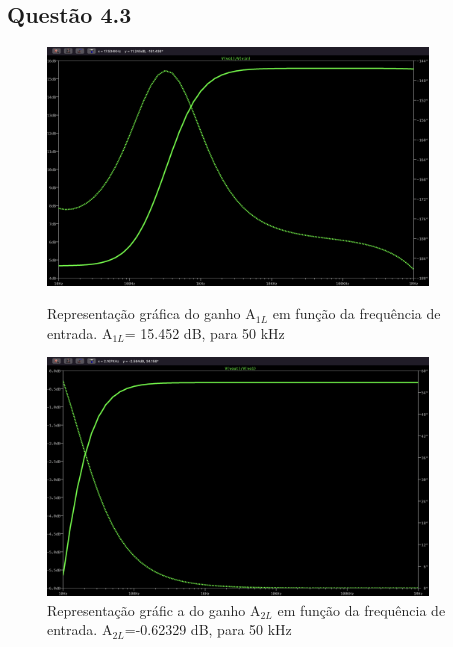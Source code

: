 \documentclass[a4paper,12pt]{article}
\begin{document}
			\subsection{Questão 4.3}
				\begin{figure}[H]
    					\centering
    					\begin{minipage}{0.45\textwidth}
        					\centering
        					\includegraphics[width=0.9\textwidth]{4.3-1.png} %
        					\caption{Representação gráfica do ganho A$_{1L}$ em função da frequência de entrada. A$_{1L}$= 15.452 dB, para 50 kHz}
    					\end{minipage}\hfill
    					\begin{minipage}{0.45\textwidth}
        					\centering
        					\includegraphics[width=0.9\textwidth]{4.3-2.png} %
        					\caption{Representação gráfic  a do ganho A$_{2L}$ em função da frequência de entrada. A$_{2L}$=-0.62329 dB, para 50 kHz}
    						\end{minipage}
				\end{figure}
\end{document}
